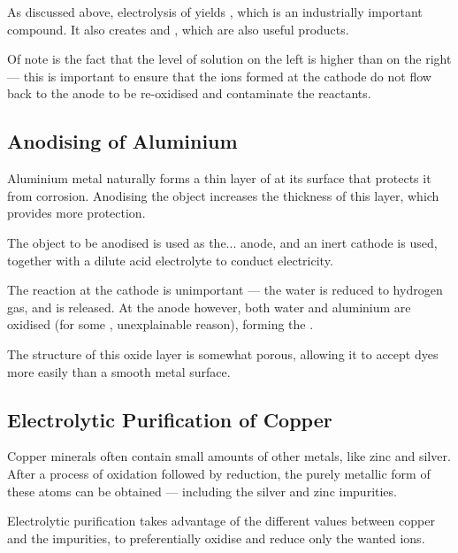 			As discussed above, electrolysis of   yields , which is an industrially
			important compound. It also creates  and , which are also useful products.


			Of note is the fact that the level of solution on the left is higher than on the right --- this is important to ensure that
			the  ions formed at the cathode do not flow back to the anode to be re-oxidised and contaminate the reactants.




		\subsection{Anodising of Aluminium}

			Aluminium metal naturally forms a thin layer of  at its surface that protects it from corrosion. Anodising the object
			increases the thickness of this layer, which provides more protection.

			The object to be anodised is used as the... anode, and an inert cathode is used, together with a dilute acid electrolyte to conduct
			electricity.

			The reaction at the cathode is unimportant --- the water is reduced to hydrogen gas, and is released. At the anode however,
			both water and aluminium are oxidised (for some , unexplainable reason), forming the .

			The structure of this oxide layer is somewhat porous, allowing it to accept dyes more easily than a smooth metal surface.



		\pagebreak
		\subsection{Electrolytic Purification of Copper}

			Copper minerals often contain small amounts of other metals, like zinc and silver. After a process of oxidation followed by
			reduction, the purely metallic form of these atoms can be obtained --- including the silver and zinc impurities.

			Electrolytic purification takes advantage of the different \Eo{} values between copper and the impurities, to preferentially
			oxidise and reduce only the wanted ions.

